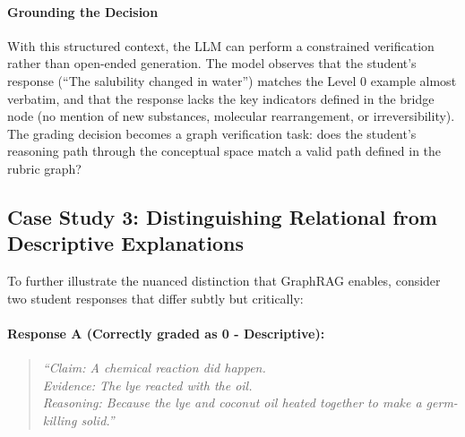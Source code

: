 \documentclass{edm_article}
\begin{document}
\paragraph{Grounding the Decision}
With this structured context, the LLM can perform a constrained verification rather than open-ended generation. The model observes that the student's response (``The salubility changed in water'') matches the Level 0 example almost verbatim, and that the response lacks the key indicators defined in the bridge node (no mention of new substances, molecular rearrangement, or irreversibility). The grading decision becomes a graph verification task: does the student's reasoning path through the conceptual space match a valid path defined in the rubric graph?

\subsection{Case Study 3: Distinguishing Relational from Descriptive Explanations}

To further illustrate the nuanced distinction that GraphRAG enables, consider two student responses that differ subtly but critically:

\paragraph{Response A (Correctly graded as 0 - Descriptive):}
\vspace{-20pt}
\begin{quote}
\vspace{-12pt}
\textit{``Claim: A chemical reaction did happen.}\\
\textit{Evidence: The lye reacted with the oil.}\\
\textit{Reasoning: Because the lye and coconut oil heated together to make a germ-killing solid.''}
\end{quote}
\vspace{-22pt}
\end{document}

